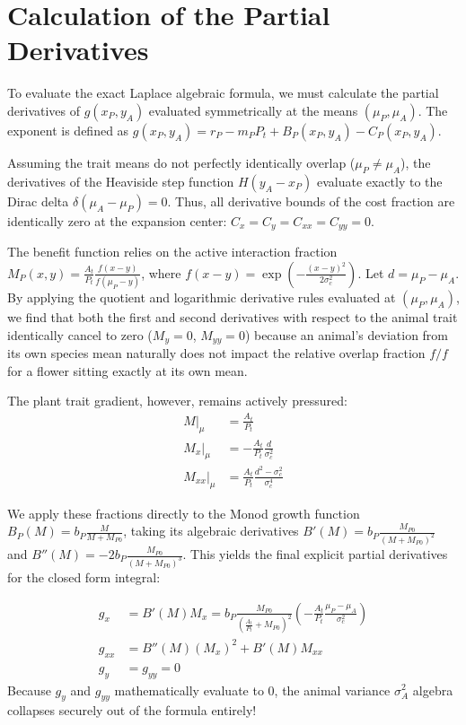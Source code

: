 \documentclass{article}
\begin{document}
\section{Calculation of the Partial Derivatives}
To evaluate the exact Laplace algebraic formula, we must calculate the partial derivatives of $g(x_P, y_A)$ evaluated symmetrically at the means $(\mu_P, \mu_A)$. The exponent is defined as $g(x_P, y_A) = r_P - m_P P_t + B_P(x_P, y_A) - C_P(x_P, y_A)$.

Assuming the trait means do not perfectly identically overlap ($\mu_P \neq \mu_A$), the derivatives of the Heaviside step function $H(y_A - x_P)$ evaluate exactly to the Dirac delta $\delta(\mu_A - \mu_P) = 0$. Thus, all derivative bounds of the cost fraction are identically zero at the expansion center: $C_x = C_y = C_{xx} = C_{yy} = 0$.

The benefit function relies on the active interaction fraction $M_P(x, y) = \frac{A_t}{P_t} \frac{f(x-y)}{f(\mu_P - y)}$, where $f(x-y) = \exp\left(-\frac{(x-y)^2}{2\sigma_c^2}\right)$. Let $d = \mu_P - \mu_A$. By applying the quotient and logarithmic derivative rules evaluated at $(\mu_P, \mu_A)$, we find that both the first and second derivatives with respect to the animal trait identically cancel to zero ($M_y = 0$, $M_{yy} = 0$) because an animal's deviation from its own species mean naturally does not impact the relative overlap fraction $f / f$ for a flower sitting exactly at its own mean. 

The plant trait gradient, however, remains actively pressured:
\begin{align}
    \left. M \right|_{\mu} &= \frac{A_t}{P_t} \\
    \left. M_x \right|_{\mu} &= -\frac{A_t}{P_t} \frac{d}{\sigma_c^2} \\
    \left. M_{xx} \right|_{\mu} &= \frac{A_t}{P_t} \frac{d^2 - \sigma_c^2}{\sigma_c^4}
\end{align}

We apply these fractions directly to the Monod growth function $B_P(M) = b_P \frac{M}{M + M_{P0}}$, taking its algebraic derivatives $B'(M) = b_P \frac{M_{P0}}{(M + M_{P0})^2}$ and $B''(M) = -2b_P \frac{M_{P0}}{(M + M_{P0})^3}$. This yields the final explicit partial derivatives for the closed form integral:

\begin{align}
    g_x &= B'(M) M_x = b_P \frac{M_{P0}}{(\frac{A_t}{P_t} + M_{P0})^2} \left( -\frac{A_t}{P_t} \frac{\mu_P - \mu_A}{\sigma_c^2} \right) \\
    g_{xx} &= B''(M) (M_x)^2 + B'(M) M_{xx} \\
    g_y &= g_{yy} = 0 
\end{align}
Because $g_y$ and $g_{yy}$ mathematically evaluate to $0$, the animal variance $\sigma_A^2$ algebra collapses securely out of the formula entirely!
\end{document}
